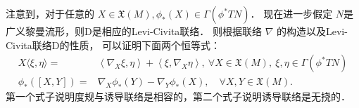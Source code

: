 注意到，对于任意的 $X \in \mathfrak{X}(M), \phi_*(X) \in \Gamma(\phi^* T N)$．
现在进一步假定 $N$是广义黎曼流形，则$\mathrm{D}$是相应的Levi-Civita联络．
则根据联络 $\nabla$ 的构造以及Levi-Civita联络$\mathrm{D}$的性质，
可以证明下面两个恒等式：
\begin{align}
    X\langle\xi, \eta\rangle= &\left\langle\nabla_X \xi, \eta\right\rangle+\left\langle\xi,
     \nabla_X \eta\right\rangle, \ \forall X \in \mathfrak{X}(M),\ \xi, \eta \in \Gamma(\phi^* T N) 
     \label{chfb:eqn_induce-con-compatibility} \\
    \phi_*([X, Y])=&\nabla_X \phi_*(Y)-\nabla_Y \phi_*(X), \quad \forall X, Y \in \mathfrak{X}(M) .
    \label{chfb:eqn_induce-con-NoTorsion}
\end{align}
第一个式子说明度规与诱导联络是相容的，第二个式子说明诱导联络是无挠的．


